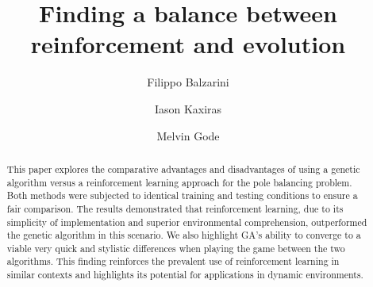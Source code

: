 \begin{frontmatter}
%
\title{%
Finding a balance between\\reinforcement and evolution\\
}
%
\author[UppsalaUniversity]{Filippo Balzarini} 
\author[UppsalaUniversity]{Iason Kaxiras}
\author[UppsalaUniversity]{Melvin Gode}
\address[UppsalaUniversity]{Department of Computer Science, Uppsala University, Uppsala, Sweden}
%
%
\renewcommand*{\today}{\MonthYearDateFormat\displaydate{dateName}} 
%
\begin{abstract}
This paper explores the comparative advantages and disadvantages of using a genetic algorithm versus a reinforcement learning approach for the pole balancing problem. 
Both methods were subjected to identical training and testing conditions to ensure a fair comparison. 
The results demonstrated that reinforcement learning, due to its simplicity of implementation and superior environmental comprehension, outperformed the genetic algorithm in this scenario. 
We also highlight GA's ability to converge to a viable very quick and stylistic differences when playing the game between the two algorithms.
This finding reinforces the prevalent use of reinforcement learning in similar contexts and highlights its potential for applications in dynamic environments.

\end{abstract}
%
\end{frontmatter}
%
%
%


